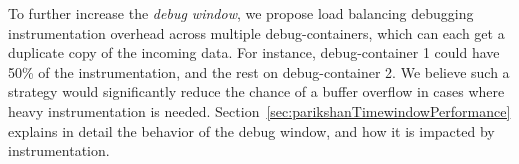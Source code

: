 To further increase the \emph{debug window}, we propose load balancing debugging instrumentation overhead across multiple debug-containers, which can each get a duplicate copy of the incoming data. 
For instance, debug-container 1 could have 50\% of the instrumentation, and the rest on debug-container 2.
We believe such a strategy would significantly reduce the chance of a buffer overflow in cases where heavy instrumentation is needed.
Section~\ref{sec:parikshanTimewindowPerformance} explains in detail the behavior of the debug window, and how it is impacted by instrumentation.
